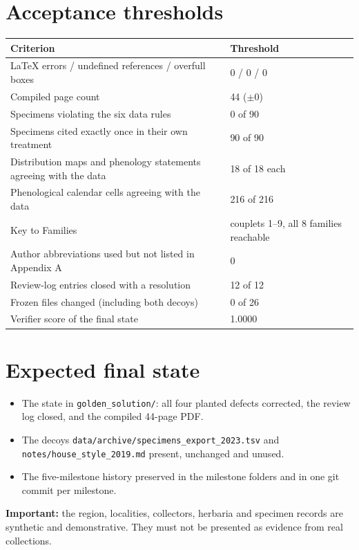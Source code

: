 \documentclass[11pt,a4paper]{article}
\begin{document}
\section*{Acceptance thresholds}
\begin{tabularx}{\linewidth}{@{}Xl@{}}
\toprule
Criterion & Threshold \\
\midrule
LaTeX errors / undefined references / overfull boxes & 0 / 0 / 0 \\
Compiled page count & 44 ($\pm$0) \\
Specimens violating the six data rules & 0 of 90 \\
Specimens cited exactly once in their own treatment & 90 of 90 \\
Distribution maps and phenology statements agreeing with the data & 18 of 18 each \\
Phenological calendar cells agreeing with the data & 216 of 216 \\
Key to Families & couplets 1--9, all 8 families reachable \\
Author abbreviations used but not listed in Appendix A & 0 \\
Review-log entries closed with a resolution & 12 of 12 \\
Frozen files changed (including both decoys) & 0 of 26 \\
Verifier score of the final state & 1.0000 \\
\bottomrule
\end{tabularx}

\section*{Expected final state}
\begin{itemize}
\item The state in \texttt{golden\_solution/}: all four planted defects
  corrected, the review log closed, and the compiled 44-page PDF.
\item The decoys \texttt{data/archive/specimens\_export\_2023.tsv} and
  \texttt{notes/house\_style\_2019.md} present, unchanged and unused.
\item The five-milestone history preserved in the milestone folders and
  in one git commit per milestone.
\end{itemize}

\textbf{Important:} the region, localities, collectors, herbaria and
specimen records are synthetic and demonstrative. They must not be
presented as evidence from real collections.
\end{document}
